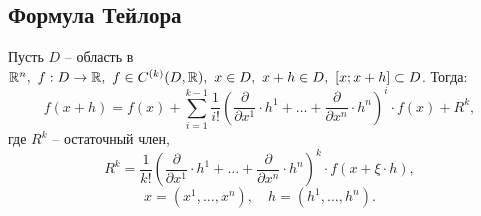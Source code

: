 \subsection{Формула Тейлора}

\begin{theorem}
    Пусть $D$ -- область в $\mathbb{R}^n, \ f:D\rightarrow\mathbb{R}, \ f\in C^{(k)}(D,\mathbb{R}), \ x \in D, \ x + h \in D, \ [x;x+h] \subset D$. Тогда:
    \[
        f(x + h) = f(x) + \sum_{i=1}^{k-1}\frac{1}{i!}\left(\frac{\partial}{\partial x^1}\cdot h^1 + \ldots + \frac{\partial}{\partial x^n}\cdot h^n\right)^i \cdot f(x) + R^k,
    \]
    где $R^k$ -- остаточный член,
    \[
        R^k = \frac{1}{k!}\left(\frac{\partial}{\partial x^1}\cdot h^1 + \ldots + \frac{\partial}{\partial x^n}\cdot h^n\right)^k \cdot f(x + \xi \cdot h),
    \]
    \[
        x = (x^1,\ldots,x^n), \quad h = (h^1,\ldots,h^n).
    \]
\end{theorem}

